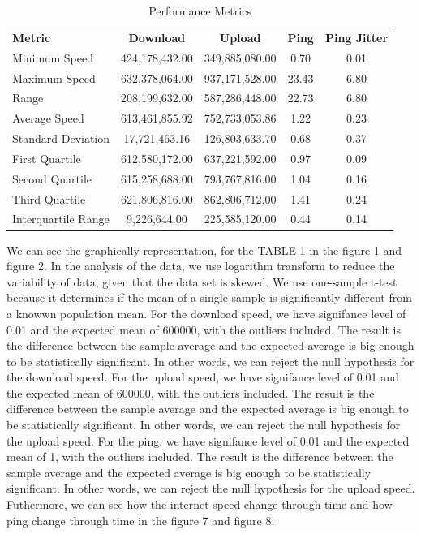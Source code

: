 \documentclass[conference]{IEEEtran}
\begin{document}
\begin{table}[htbp]
    \centering
    \caption{Performance Metrics}
    \begin{tabular}{lcccc}
        \textbf{Metric} & \textbf{Download} & \textbf{Upload} & \textbf{Ping} & \textbf{Ping Jitter} \\
        Minimum Speed & 424,178,432.00 & 349,885,080.00 & 0.70 & 0.01 \\
        Maximum Speed & 632,378,064.00 & 937,171,528.00 & 23.43 & 6.80 \\
        Range & 208,199,632.00 & 587,286,448.00 & 22.73 & 6.80 \\
        Average Speed & 613,461,855.92 & 752,733,053.86 & 1.22 & 0.23 \\
        Standard Deviation & 17,721,463.16 & 126,803,633.70 & 0.68 & 0.37 \\
        First Quartile & 612,580,172.00 & 637,221,592.00 & 0.97 & 0.09 \\
        Second Quartile & 615,258,688.00 & 793,767,816.00 & 1.04 & 0.16 \\
        Third Quartile & 621,806,816.00 & 862,806,712.00 & 1.41 & 0.24 \\
        Interquartile Range & 9,226,644.00 & 225,585,120.00 & 0.44 & 0.14 \\
    \end{tabular}
    \label{tab:performance}
\end{table}
We can see the graphically representation, for the TABLE 1 in the figure 1 and figure 2.
In the analysis of the data, we use logarithm transform to reduce the variability of data, given that the data set is skewed.
We use one-sample t-test because it determines if the mean of a single sample is significantly different from a knowwn population mean.
For the download speed, we have signifance level of 0.01 and the expected mean of 600000, with the outliers included. 
The result is the difference between the sample average and the expected average is big enough to be statistically significant. 
In other words, we can reject the null hypothesis for the download speed.
For the upload speed, we have signifance level of 0.01 and the expected mean of 600000, with the outliers included. 
The result is the difference between the sample average and the expected average is big enough to be statistically significant. 
In other words, we can reject the null hypothesis for the upload speed.
For the ping, we have signifance level of 0.01 and the expected mean of 1, with the outliers included. 
The result is the difference between the sample average and the expected average is big enough to be statistically significant. 
In other words, we can reject the null hypothesis for the upload speed.
Futhermore, we can see how the internet speed change through time and how ping change through time in the figure 7 and figure 8.
\end{document}
